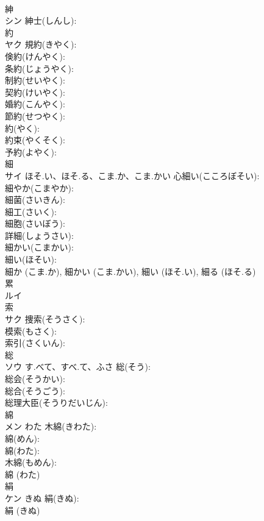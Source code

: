 \documentclass[8pt]{extreport}
\begin{document}
\begin{CJK}{UTF8}{min}
\\	紳			
\\	シン		紳士(しんし): 
\\	約			
\\	ヤク		規約(きやく): 
\\	倹約(けんやく): 
\\	条約(じょうやく): 
\\	制約(せいやく): 
\\	契約(けいやく): 
\\	婚約(こんやく): 
\\	節約(せつやく): 
\\	約(やく): 
\\	約束(やくそく): 
\\	予約(よやく): 
\\	細			
\\	サイ	ほそ.い、ほそ.る、こま.か、こま.かい	心細い(こころぼそい): 
\\	細やか(こまやか): 
\\	細菌(さいきん): 
\\	細工(さいく): 
\\	細胞(さいぼう): 
\\	詳細(しょうさい): 
\\	細かい(こまかい): 
\\	細い(ほそい): 
\\	細か (こま.か), 細かい (こま.かい), 細い (ほそ.い), 細る (ほそ.る)
\\	累			
\\	ルイ			
\\	索			
\\	サク		捜索(そうさく): 
\\	模索(もさく): 
\\	索引(さくいん): 
\\	総			
\\	ソウ	す.べて、すべ.て、ふさ	総(そう): 
\\	総会(そうかい): 
\\	総合(そうごう): 
\\	総理大臣(そうりだいじん): 
\\	綿			
\\	メン	わた	木綿(きわた): 
\\	綿(めん): 
\\	綿(わた): 
\\	木綿(もめん): 
\\	綿 (わた)
\\	絹			
\\	ケン	きぬ	絹(きぬ): 
\\	絹 (きぬ)

\end{CJK}
\end{document}
